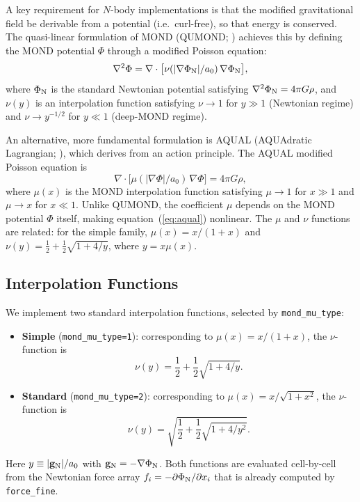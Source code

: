 \documentclass[fleqn,usenatbib]{mnras}
\newcommand{\code}[1]{\texttt{#1}}
\newcommand{\azero}{a_0}
\newcommand{\gN}{\mathbf{g}_{\rm N}}
\begin{document}
A key requirement for $N$-body implementations is that the modified
gravitational field be derivable from a potential (i.e.\ curl-free), so
that energy is conserved.  The quasi-linear formulation of MOND
(QUMOND; \citealt{Milgrom2010}) achieves this by defining the MOND
potential $\Phi$ through a modified Poisson equation:
\begin{equation}
\nabla^2 \Phi = \nabla \cdot \bigl[\nu(|\nabla\Phi_{\rm N}|/\azero)
\,\nabla\Phi_{\rm N}\bigr],
\label{eq:qumond}
\end{equation}
where $\Phi_{\rm N}$ is the standard Newtonian potential satisfying
$\nabla^2 \Phi_{\rm N} = 4\pi G\rho$, and $\nu(y)$ is an
interpolation function satisfying $\nu \to 1$ for $y \gg 1$
(Newtonian regime) and $\nu \to y^{-1/2}$ for $y \ll 1$ (deep-MOND
regime).

An alternative, more fundamental formulation is AQUAL (AQUAdratic
Lagrangian; \citealt{Bekenstein1984}), which derives from an action
principle.  The AQUAL modified Poisson equation is
\begin{equation}
\nabla \cdot \bigl[\mu(|\nabla\Phi|/\azero)\,\nabla\Phi\bigr]
= 4\pi G\rho,
\label{eq:aqual}
\end{equation}
where $\mu(x)$ is the MOND interpolation function satisfying
$\mu \to 1$ for $x \gg 1$ and $\mu \to x$ for $x \ll 1$.  Unlike
QUMOND, the coefficient $\mu$ depends on the MOND potential $\Phi$
itself, making equation~(\ref{eq:aqual}) nonlinear.  The $\mu$ and
$\nu$ functions are related: for the simple family, $\mu(x) = x/(1+x)$
and $\nu(y) = \tfrac{1}{2} + \tfrac{1}{2}\sqrt{1+4/y}$, where
$y = x\mu(x)$.

\subsection{Interpolation Functions}
\label{sec:mond_nu}

We implement two standard interpolation functions, selected by
\code{mond\_mu\_type}:
\begin{itemize}
\item \textbf{Simple} (\code{mond\_mu\_type=1}): corresponding to
  $\mu(x)=x/(1+x)$, the $\nu$-function is
  \begin{equation}
  \nu(y) = \frac{1}{2} + \frac{1}{2}\sqrt{1 + 4/y}.
  \label{eq:nu_simple}
  \end{equation}

\item \textbf{Standard} (\code{mond\_mu\_type=2}): corresponding to
  $\mu(x)=x/\sqrt{1+x^2}$, the $\nu$-function is
  \begin{equation}
  \nu(y) = \sqrt{\frac{1}{2} + \frac{1}{2}\sqrt{1 + 4/y^2}}.
  \label{eq:nu_standard}
  \end{equation}
\end{itemize}
Here $y \equiv |\gN|/\azero$ with $\gN = -\nabla\Phi_{\rm N}$.  Both
functions are evaluated cell-by-cell from the Newtonian force array
$f_i = -\partial\Phi_{\rm N}/\partial x_i$ that is already computed by
\code{force\_fine}.
\end{document}
